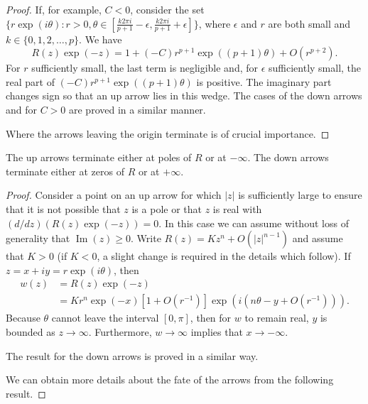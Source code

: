 \begin{proof}
If, for example, \( C < 0 \), consider the set \( \{ r \exp(i\theta) : r > 0, \theta \in [\frac{k 2\pi i}{p + 1} - \epsilon, \frac{k 2\pi i}{p + 1} + \epsilon] \} \), where \( \epsilon \) and \( r \) are both small and \( k \in \{0, 1, 2, \dots, p\} \). We have
\[
R(z) \exp(-z) = 1 + (-C) r^{p+1} \exp((p+1)\theta) + O(r^{p+2}).
\]
For \( r \) sufficiently small, the last term is negligible and, for \( \epsilon \) sufficiently small, the real part of \( (-C) r^{p+1} \exp((p+1)\theta) \) is positive. The imaginary part changes sign so that an up arrow lies in this wedge. The cases of the down arrows and for \( C > 0 \) are proved in a similar manner.

Where the arrows leaving the origin terminate is of crucial importance.
\end{proof}

\begin{theorem}

  \label{thm:355C}
The up arrows terminate either at poles of $R$ or at $-\infty$.
The down arrows terminate either at zeros of $R$ or at $+\infty$.
\end{theorem}

\begin{proof}
Consider a point on an up arrow for which $|z|$ is sufficiently large
to ensure that it is not possible that $z$ is a pole or that $z$ is real with
$(d/dz)(R(z) \exp(-z)) = 0$. In this case we can assume without loss of
generality that $\operatorname{Im}(z) \geq 0$. Write $R(z) = Kz^{n} + O(|z|^{n-1})$ and assume that
$K > 0$ (if $K < 0$, a slight change is required in the details which follow). If
$z = x + iy = r \exp(i\theta)$, then
\[
\begin{aligned}
w(z) &= R(z) \exp(-z) \\
     &= K r^{n} \exp(-x) \left[ 1 + O(r^{-1}) \right] \exp\left( i\left( n\theta - y + O(r^{-1}) \right) \right).
\end{aligned}
\]
Because $\theta$ cannot leave the interval $[0, \pi]$, then for $w$ to remain real, $y$ is
bounded as $z \to \infty$. Furthermore, $w \to \infty$ implies that $x \to -\infty$.

The result for the down arrows is proved in a similar way.

We can obtain more details about the fate of the arrows from the following
result.
\end{proof}

